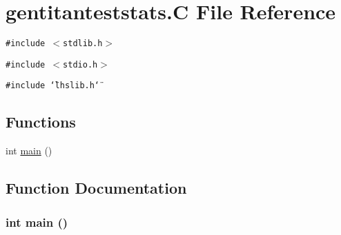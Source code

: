 \hypertarget{gentitanteststats_8C}{
\section{gentitanteststats.C File Reference}
\label{gentitanteststats_8C}
}
{\tt \#include $<$stdlib.h$>$}\par
{\tt \#include $<$stdio.h$>$}\par
{\tt \#include \char`\"{}lhslib.h\char`\"{}}\par
\subsection*{Functions}
\begin{CompactItemize}
\item 
int \hyperlink{gentitanteststats_8C_a0}{main} ()
\end{CompactItemize}


\subsection{Function Documentation}
\hypertarget{gentitanteststats_8C_a0}{
\subsubsection[main]{\setlength{\rightskip}{0pt plus 5cm}int main ()}}
\label{gentitanteststats_8C_a0}


